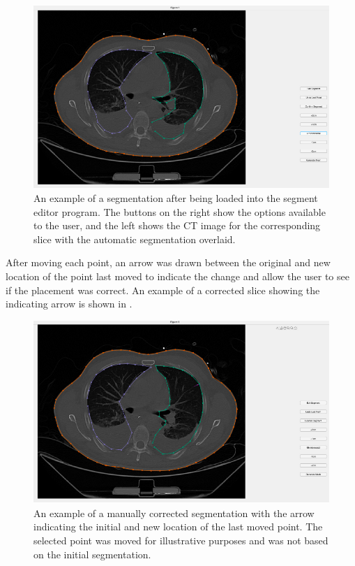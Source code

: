 \begin{figure}
	\centering
	\includegraphics[width=\textwidth]{chapter5-CT_to_mesh/imgs/SegmentationAppLoaded.pdf}
	\caption[Manual segmentation interface with initial input]{\label{fig:seg-app-loaded}%
	An example of a segmentation after being loaded into the segment editor program. 
	The buttons on the right show the options available to the user, and the left shows the 
	CT image for the corresponding slice with the automatic segmentation overlaid.
	}
\end{figure}

After moving each point, an arrow was drawn between the original and new location of the
point last moved to indicate the change and allow the user to see if the
placement was correct. An example of a corrected slice showing the indicating arrow 
is shown in .

\begin{figure}
	\centering
	\includegraphics[width=\textwidth]{chapter5-CT_to_mesh/imgs/SegmentationAppCorrected.pdf}
	\caption[Manually corrected segmentation]{\label{fig:seg-app-corrected}%
	An example of a manually corrected segmentation with the arrow indicating the initial
	and new location of the last moved point. The selected point was moved for illustrative
	purposes and was not based on the initial segmentation.}
\end{figure}

